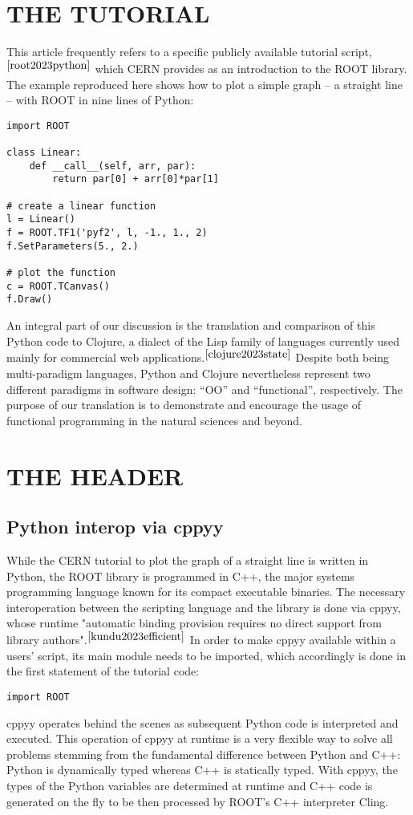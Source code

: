 \documentclass[twocolumn]{article}
\begin{document}
\section{THE TUTORIAL}
This article frequently refers to a specific publicly available tutorial script,$^{\cite{root2023python}}$ which CERN provides as an introduction to the ROOT library. The example reproduced here shows how to plot a simple graph – a straight line – with ROOT in nine lines of Python:
{\color{magenta}\begin{verbatim}
import ROOT

class Linear:
    def __call__(self, arr, par):
        return par[0] + arr[0]*par[1]

# create a linear function
l = Linear()
f = ROOT.TF1('pyf2', l, -1., 1., 2)
f.SetParameters(5., 2.)

# plot the function
c = ROOT.TCanvas()
f.Draw()
\end{verbatim}}
An integral part of our discussion is the translation and comparison of this Python code to Clojure, a dialect of the Lisp family of languages currently used mainly for commercial web applications.$^{\cite{clojure2023state}}$ Despite both being multi-paradigm languages, Python and Clojure nevertheless represent two different paradigms in software design: “OO” and “functional”, respectively. The purpose of our translation is to demonstrate and encourage the usage of functional programming in the natural sciences and beyond.

\section{THE HEADER}
\subsection{Python interop via cppyy}
While the CERN tutorial to plot the graph of a straight line is written in Python, the ROOT library is programmed in C++, the major systems programming language known for its compact executable binaries. The necessary interoperation between the scripting language and the library is done via cppyy, whose runtime "automatic binding provision requires no direct support from library authors".$^{\cite{kundu2023efficient}}$ In order to make cppyy available within a users’ script, its main module needs to be imported, which accordingly is done in the first statement of the tutorial code:
{\color{magenta}\begin{verbatim}
import ROOT
\end{verbatim}}
cppyy operates behind the scenes as subsequent Python code is interpreted and executed. This operation of cppyy at runtime is a very flexible way to solve all problems stemming from the fundamental difference between Python and C++: Python is dynamically typed whereas C++ is statically typed. With cppyy, the types of the Python variables are determined at runtime and C++ code is generated on the fly to be then processed by ROOT’s C++ interpreter Cling.
\end{document}
